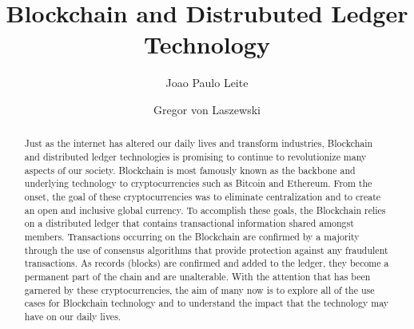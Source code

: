 

\title{Blockchain and Distrubuted Ledger Technology}


\author{Joao Paulo Leite}

\author{Gregor von Laszewski}


\renewcommand{\shortauthors}{J. Leite}


\begin{abstract}
Just as the internet has altered our daily lives and transform industries, Blockchain and distributed ledger technologies is promising to continue to revolutionize many aspects of our society.  Blockchain is most famously known as the backbone and underlying technology to cryptocurrencies such as Bitcoin and Ethereum.  From the onset, the goal of these cryptocurrencies was to eliminate centralization and to create an open and inclusive global currency. To accomplish these goals, the Blockchain relies on a distributed ledger that contains transactional information shared amongst members. Transactions occurring on the Blockchain are confirmed by a majority through the use of consensus algorithms that provide protection against any fraudulent transactions. As records (blocks) are confirmed and added to the ledger, they become a permanent part of the chain and are unalterable. With the attention that has been garnered by these cryptocurrencies, the aim of many now is to explore all of the use cases for Blockchain technology and to understand the impact that the technology may have on our daily lives. 

\end{abstract}



\maketitle


